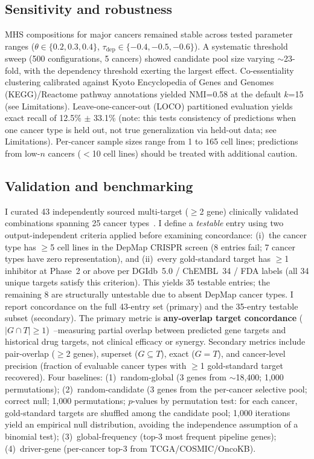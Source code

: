 \documentclass[11pt]{article}
\begin{document}
\subsection*{Sensitivity and robustness}
MHS compositions for major cancers remained stable across tested parameter ranges ($\theta \in \{0.2, 0.3, 0.4\}$, $\tau_{\text{dep}} \in \{-0.4, -0.5, -0.6\}$). A systematic threshold sweep (500 configurations, 5 cancers) showed candidate pool size varying $\sim$23-fold, with the dependency threshold exerting the largest effect. Co-essentiality clustering calibrated against Kyoto Encyclopedia of Genes and Genomes (KEGG)/Reactome pathway annotations yielded NMI=0.58 at the default $k$=15 (see Limitations). Leave-one-cancer-out (LOCO) partitioned evaluation yields exact recall of 12.5\% $\pm$ 33.1\% (note: this tests consistency of predictions when one cancer type is held out, not true generalization via held-out data; see Limitations). Per-cancer sample sizes range from 1 to 165 cell lines; predictions from low-$n$ cancers ($<$10 cell lines) should be treated with additional caution.

\subsection*{Validation and benchmarking}
I curated 43 independently sourced multi-target ($\geq$2 gene) clinically validated combinations spanning 25 cancer types~\cite{Long2014,Planchard2016,Kopetz2019,Larkin2014,Park2021,Sequist2020,Baselga2012,Turner2015,Motzer2015,Daver2022,Ciruelos2024,Bhardwaj2019,Liaki2025}. I define a \emph{testable} entry using two output-independent criteria applied before examining concordance: (i)~the cancer type has $\geq$5 cell lines in the DepMap CRISPR screen (8 entries fail; 7 cancer types have zero representation), and (ii)~every gold-standard target has $\geq$1 inhibitor at Phase~2 or above per DGIdb~5.0 / ChEMBL~34 / FDA labels (all 34 unique targets satisfy this criterion). This yields 35 testable entries; the remaining 8 are structurally untestable due to absent DepMap cancer types. I report concordance on the full 43-entry set (primary) and the 35-entry testable subset (secondary). The primary metric is \textbf{any-overlap target concordance} ($|G \cap T| \geq 1$)~\cite{Julkunen2023}--measuring partial overlap between predicted gene targets and historical drug targets, not clinical efficacy or synergy. Secondary metrics include pair-overlap ($\geq$2 genes), superset ($G \subseteq T$), exact ($G = T$), and cancer-level precision (fraction of evaluable cancer types with $\geq$1 gold-standard target recovered). Four baselines: (1)~random-global (3 genes from $\sim$18,400; 1{,}000 permutations); (2)~random-candidate (3 genes from the per-cancer selective pool; correct null; 1{,}000 permutations; $p$-values by permutation test: for each cancer, gold-standard targets are shuffled among the candidate pool; 1{,}000 iterations yield an empirical null distribution, avoiding the independence assumption of a binomial test); (3)~global-frequency (top-3 most frequent pipeline genes); (4)~driver-gene (per-cancer top-3 from TCGA/COSMIC/OncoKB).
\end{document}
